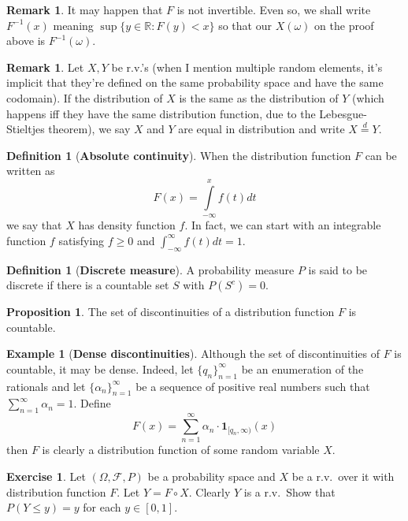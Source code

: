 \documentclass{article}
\theoremstyle{definition}
\newtheorem{proposition}[theorem]{Proposition}
\newtheorem{definition}[theorem]{Definition}
\newtheorem{remark}[theorem]{Remark}
\newtheorem{example}[theorem]{Example}
\newtheorem{exercise}[theorem]{Exercise}
\begin{document}

\begin{remark}
    It may happen that $F$ is not invertible. Even so, we shall write $F^{-1}(x)$ meaning $\sup \{ y \in \mathbb{R} : F(y) < x \}$ so that our $X(\omega)$ on the proof above is $F^{-1}(\omega)$.
\end{remark}

\begin{remark}
    Let $X, Y$ be r.v.'s (when I mention multiple random elements, it's implicit that they're defined on the same probability space and have the same codomain). If the distribution of $X$ is the same as the distribution of $Y$ (which happens iff they have the same distribution function, due to the Lebesgue-Stieltjes theorem), we say $X$ and $Y$ are equal in distribution and write $X \stackrel{d}{=} Y$.
\end{remark}

\begin{definition}[\textbf{Absolute continuity}]
    When the distribution function $F$ can be written as
    \[ F(x) = \int\limits_{-\infty}^x f(t) dt \]
    we say that $X$ has density function $f$. In fact, we can start with an integrable function $f$ satisfying $f \geq 0$ and $\int_{-\infty}^{\infty} f(t) dt = 1$.
\end{definition}

\begin{definition}[\textbf{Discrete measure}]
    A probability measure $P$ is said to be discrete if there is a countable set $S$ with $P(S^c) = 0$.
\end{definition}

\begin{proposition}
    The set of discontinuities of a distribution function $F$ is countable.
\end{proposition}

\begin{example}[\textbf{Dense discontinuities}]
    Although the set of discontinuities of $F$ is countable, it may be dense. Indeed, let $\{ q_n \}_{n=1}^\infty$ be an enumeration of the rationals and let $\{ \alpha_n \}_{n=1}^\infty$ be a sequence of positive real numbers such that $\sum_{n=1}^\infty \alpha_n = 1$. Define
    \[ F(x) = \sum\limits_{n=1}^\infty \alpha_n \cdot \mathbf{1}_{[q_n, \infty)}(x) \]
    then $F$ is clearly a distribution function of some random variable $X$.
\end{example}

\begin{exercise}
    Let $(\Omega, \mathcal{F}, P)$ be a probability space and $X$ be a r.v.\ over it with distribution function $F$. Let $Y = F \circ X$. Clearly $Y$ is a r.v.\ Show that $P(Y \leq y) = y$ for each $y \in [0,1]$.
\end{exercise}
\end{document}
